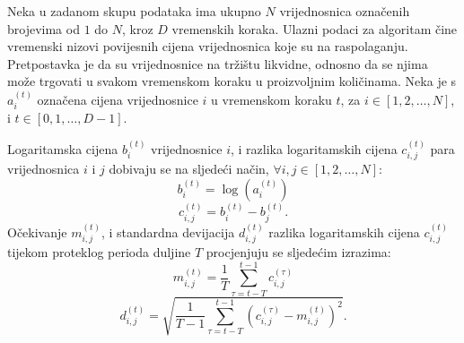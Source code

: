 \documentclass[lmodern, utf8, diplomski, numeric]{fer}
\newcommand{\q}{\left}
\newcommand{\w}{\right}
\begin{document}
  Neka u zadanom skupu podataka ima ukupno $N$ vrijednosnica označenih brojevima od $1$ do $N$, kroz $D$ vremenskih koraka.
  Ulazni podaci za algoritam čine vremenski nizovi povijesnih cijena vrijednosnica koje su na raspolaganju.
  Pretpostavka je da su vrijednosnice na tržištu likvidne, odnosno da se njima može trgovati u svakom vremenskom koraku u proizvoljnim količinama.
  Neka je s $a_i^{\q(t\w)}$ označena cijena vrijednosnice $i$ u vremenskom koraku $t$, za $i \in {\q[1, 2, \ldots, N\w]}$, i $t \in {\q[0, 1, \ldots, D-1\w]}$.
  
  Logaritamska cijena $b_i^{\q(t\w)}$ vrijednosnice $i$, i razlika logaritamskih cijena $c_{i,j}^{\q(t\w)}$ para vrijednosnica $i$ i $j$ dobivaju se na sljedeći način, $\forall i, j \in \q[1, 2, \ldots, N\w]$:
  \begin{equation}
    \label{eq:log_price}
  b_i^{\q(t\w)} = \log\q(a_i^{\q(t\w)}\w)
  \end{equation}
  \begin{equation}
    \label{eq:log_price_diff}
    c_{i,j}^{\q(t\w)} = b_i^{\q(t\w)} - b_j^{\q(t\w)}.
  \end{equation}
  Očekivanje $m_{i,j}^{\q(t\w)}$, i standardna devijacija $d_{i,j}^{\q(t\w)}$ razlika logaritamskih cijena $c_{i,j}^{\q(t\w)}$ tijekom proteklog perioda duljine $T$ procjenjuju se sljedećim izrazima:
  \begin{equation}
  \label{eq:mean}
    m_{i,j}^{\q(t\w)} = \frac{1}{T}\sum_{\tau = t - T}^{t - 1} c_{i,j}^{(\tau)}
  \end{equation}
  \begin{equation}
  \label{eq:deviation}
    d_{i,j}^{\q(t\w)} = \sqrt{\frac{1}{T - 1}\sum_{\tau=t - T}^{t - 1} \q(c_{i,j}^{(\tau)} - m_{i,j}^{\q(t\w)} \w)^2}.
  \end{equation}
  
\end{document}
